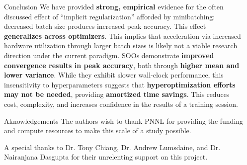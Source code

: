 \documentclass[final]{beamer}
\newlength{\sepwidth}
\newlength{\colwidth}
\newcommand{\separatorcolumn}{\begin{column}{\sepwidth}\end{column}}
\begin{document}
\begin{frame}[t]
\begin{columns}[t]
\begin{column}{\colwidth}
      \begin{block}{Conclusion}
        We have provided \textbf{strong, empirical} evidence for the often discussed effect of
        ``implicit regularization'' afforded by minibatching: decreased batch size produces
        increased peak accuracy. This effect \textbf{generalizes across optimizers}. This implies
        that acceleration via increased hardware utilization through larger batch sizes is likely
        not a viable research direction under the current paradigm. SOOs demonstrate \textbf{improved
          convergence results in peak accuracy}, both through \textbf{higher mean and lower variance}.
        While they exhibit slower wall-clock performance, this insensitivity to hyperparameters
        suggests that \textbf{hyperoptimization efforts may not be needed}, providing
        \textbf{amortized time savings}.  This reduces cost, complexity, and increases confidence in
        the results of a training session.

      \end{block}

      \begin{block}{Aknowledgements}
        The authors wish to thank PNNL for providing the funding and compute resources to make this scale
        of a study possible.

        A special thanks to Dr. Tony Chiang, Dr. Andrew Lumsdaine, and Dr. Nairanjana Dasgupta for
        their unrelenting support on this project.
      \end{block}

    \end{column}

    \separatorcolumn
  \end{columns}
\end{frame}
\end{document}
